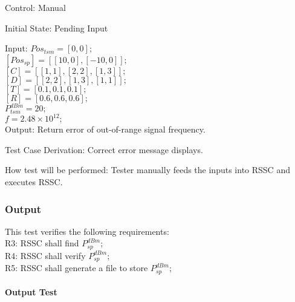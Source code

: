 \documentclass[12pt, titlepage]{article}
\begin{document}
\begin{enumerate}
Control: Manual
					
Initial State: Pending Input
					
Input:
$Pos_{tsm} = [0,0];$\\
$[Pos_{sp}] = [[10,0],[-10,0]];$\\
$[C] = [[1,1],[2,2],[1,3]];$\\
$[D] = [[2,2],[1,3],[1,1]];$\\
$[T] = [0.1,0.1,0.1];$\\
$[R] = [0.6,0.6,0.6];$\\
$P_{tsm}^{dBm} = 20;$\\
$f = 2.48\times10^{12};$\\

Output: Return error of out-of-range signal frequency.

Test Case Derivation: Correct error message displays.
					
How test will be performed: Tester manually feeds the inputs into
RSSC and executes RSSC.

\end{enumerate}

\subsubsection{Output}\label{Aoutput}
\label{area2}

This test verifies the following requirements: \\
\indent  R3: RSSC shall find $P_{sp}^{dBm}$;\\
\indent  R4: RSSC shall verify $P_{sp}^{dBm}$;\\
\indent  R5: RSSC shall generate a file to store $P_{sp}^{dBm}$;\\

\paragraph{Output Test}
\end{document}
